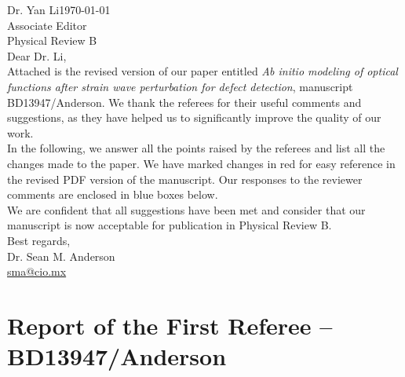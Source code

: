 \documentclass[aps,prb,10pt,endfloats]{revtex4-1}
\begin{document}
\noindent Dr. Yan Li\hfill{\today}\\
Associate Editor\\
Physical Review B\\

\noindent Dear Dr. Li,\\

Attached is the revised version of our paper entitled \emph{Ab initio modeling
of optical functions after strain wave perturbation for defect detection},
manuscript BD13947/Anderson. We thank the referees for their useful comments and
suggestions, as they have helped us to significantly improve the quality of our
work.\\

In the following, we answer all the points raised by the referees and list all
the changes made to the paper. We have marked changes in red for easy reference
in the revised PDF version of the manuscript. Our responses to the reviewer
comments are enclosed in blue boxes below.\\

We are confident that all suggestions have been met and consider that our
manuscript is now acceptable for publication in Physical Review B.\\

\noindent Best regards,\\

\noindent Dr. Sean M. Anderson\\
\href{mailto:sma@cio.mx}{sma@cio.mx}


\section{Report of the First Referee -- BD13947/Anderson}
\end{document}
